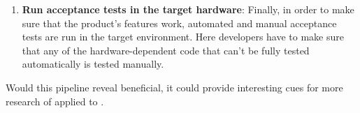 \begin{enumerate}
    \item \textbf{Run acceptance tests in the target hardware}: Finally, in order to make sure that the product's features work, automated and manual acceptance tests are run in the target environment. Here developers have to make sure that any of the hardware-dependent code that can't be fully tested automatically is tested manually.
\end{enumerate}

Would this pipeline reveal beneficial, it could provide interesting cues for more research of \tdd applied to \ess.